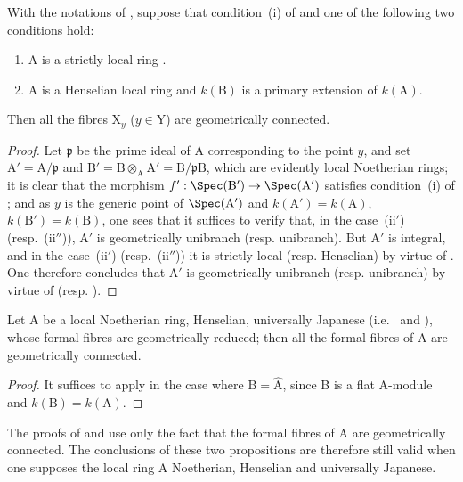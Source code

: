 \begin{corollary}[18.9.8]
\label{IV.18.9.8}
With the notations of , suppose that condition~(i) of  and one of the following two conditions hold:
\begin{enumerate}
  \item[\rm(ii$'$)] A is a strictly local ring .
  \item[\rm(ii$''$)] A is a Henselian local ring and $k(\mathrm{B})$ is a primary extension of $k(\mathrm{A})$.
\end{enumerate}
Then all the fibres $\mathrm{X}_y$ ($y\in\mathrm{Y}$) are geometrically connected.
\end{corollary}

\begin{proof}
Let $\mathfrak{p}$ be the prime ideal of A corresponding to the point $y$, and set $\mathrm{A}'=\mathrm{A}/\mathfrak{p}$ and $\mathrm{B}'=\mathrm{B}\otimes_{\mathrm{A}}\mathrm{A}'=\mathrm{B}/\mathfrak{p}\mathrm{B}$, which are evidently local Noetherian rings;
it is clear that the morphism $f':\Spec(\mathrm{B}')\to\Spec(\mathrm{A}')$ satisfies condition~(i) of ;
and as $y$ is the generic point of $\Spec(\mathrm{A}')$ and $k(\mathrm{A}')=k(\mathrm{A})$, $k(\mathrm{B}')=k(\mathrm{B})$, one sees that it suffices to verify that, in the case~(ii$'$) (resp.~(ii$''$)), $\mathrm{A}'$ is geometrically unibranch (resp. unibranch).
But $\mathrm{A}'$ is integral, and in the case~(ii$'$) (resp.~(ii$''$)) it is strictly local (resp. Henselian) by virtue of .
One therefore concludes that $\mathrm{A}'$ is geometrically unibranch (resp. unibranch) by virtue of  (resp. ).
\end{proof}

\begin{corollary}[18.9.9]
\label{IV.18.9.9}
Let $\mathrm{A}$ be a local Noetherian ring, Henselian, universally Japanese (i.e.~ and ), whose formal fibres  are geometrically reduced;
then all the formal fibres of A are geometrically connected.
\end{corollary}

\begin{proof}
It suffices to apply  in the case where $\mathrm{B}=\hat{\mathrm{A}}$, since B is a flat A-module and $k(\mathrm{B})=k(\mathrm{A})$.
\end{proof}

\begin{remark}[18.9.10]
\label{IV.18.9.10}
The proofs of  and  use only the fact that the formal fibres of A are geometrically connected.
The conclusions
of these two propositions are therefore still valid when one supposes the local ring A Noetherian, Henselian and universally Japanese.
\end{remark}

